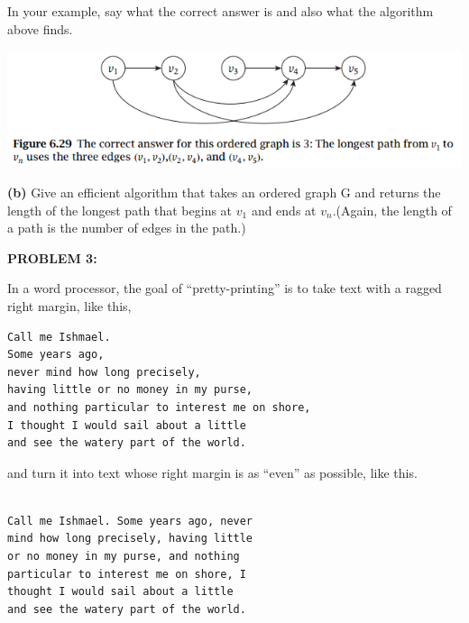 \documentclass[11pt]{article}
\begin{document}
\vspace{2mm}

In your example, say what the correct answer is and also what the algorithm above finds.

\includegraphics[scale=1]{2.png}

\vspace{2mm}

\noindent \textbf{(b)} Give an efficient algorithm that takes an ordered graph G and returns  the length of the longest path that begins at $v_1$ and ends at $v_n$.(Again, the length of a path is the number of edges in the path.)

\vspace{6mm}

\noindent \textbf{PROBLEM 3:} 

\vspace{2mm}

\noindent In a word processor, the goal of ``pretty-printing'' is to take text with a ragged right margin, like this,

\vspace{2mm}

\begin{lstlisting}
Call me Ishmael. 
Some years ago, 
never mind how long precisely,
having little or no money in my purse, 
and nothing particular to interest me on shore, 
I thought I would sail about a little 
and see the watery part of the world.

\end{lstlisting}

\vspace{2mm}

\noindent and turn it into text whose right margin is as ``even'' as possible, like this.

\vspace{2mm}

\begin{lstlisting}

Call me Ishmael. Some years ago, never 
mind how long precisely, having little 
or no money in my purse, and nothing 
particular to interest me on shore, I 
thought I would sail about a little 
and see the watery part of the world.

\end{lstlisting}
\end{document}
